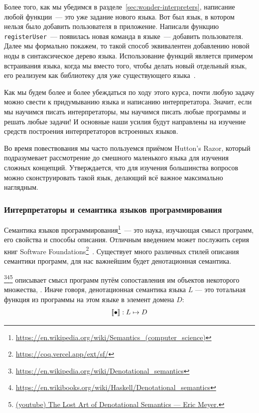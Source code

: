 Более того, как мы убедимся в разделе~\ref{sec:wonder-interpreters}, написание любой функции~--- это уже задание нового языка.
Вот был язык, в котором нельзя было добавить пользователя в приложение.
Написали функцию \texttt{registerUser}~--- появилась новая команда в языке~--- добавить пользователя.
Далее мы формально покажем, то такой способ эквивалентен добавлению новой ноды в синтаксическое дерево языка. %
Использование функций является примером встраивания языка, когда мы вместо того, чтобы делать новый отдельный язык, его реализуем как библиотеку для уже существующего языка~\cite{gibbons2013functional}.

Как мы будем более и более убеждаться по ходу этого курса, почти любую задачу можно свести к придумыванию языка и написанию интерпретатора.
Значит, если мы научимся писать интерпретаторы, мы научимся писать любые программы и решать любые задачи!
И основные наши усилия будут направлены на изучение средств построения интерпретаторов встроенных языков.

Во время повествования мы часто пользуемся приёмом Hutton's Razor, который подразумевает рассмотрение до смешного маленького языка для изучения сложных концепций.
Утверждается, что для изучения большинства вопросов можно сконструировать такой язык, делающий всё важное максимально наглядным.

\subsubsection{Интерпретаторы и семантика языков программирования} \label{subsec:semantics}

Семантика языков программирования\footnote{\url{https://en.wikipedia.org/wiki/Semantics_(computer_science)}\label{note:sema-wiki}}~--- это наука, изучающая смысл программ, его свойства и способы описания.
Отличным введением может послужить серия книг Software Foundations\footnote{\url{https://coq.vercel.app/ext/sf/}}~\cite{pierce2010software}.
Существует много различных стилей описания семантики программ, для нас важнейшим будет денотационная семантика.

\footnote{\url{https://en.wikipedia.org/wiki/Denotational_semantics}}\footnote{\url{https://en.wikibooks.org/wiki/Haskell/Denotational_semantics}}\footnote{\href{https://youtu.be/pQyH0p-XJzE?si=TUEzrpHhJZfO7dTF}{(youtube) The Lost Art of Denotational Semantics --- Eric Meyer.}} описывает смысл программ путём сопоставления им объектов некоторого множества, .
Иначе говоря, денотационная семантика языка $L$ --- это тотальная функция из программы на этом языке в элемент домена $D$:
\[
    \llbracket{\bullet}\rrbracket : L \mapsto D
\]

